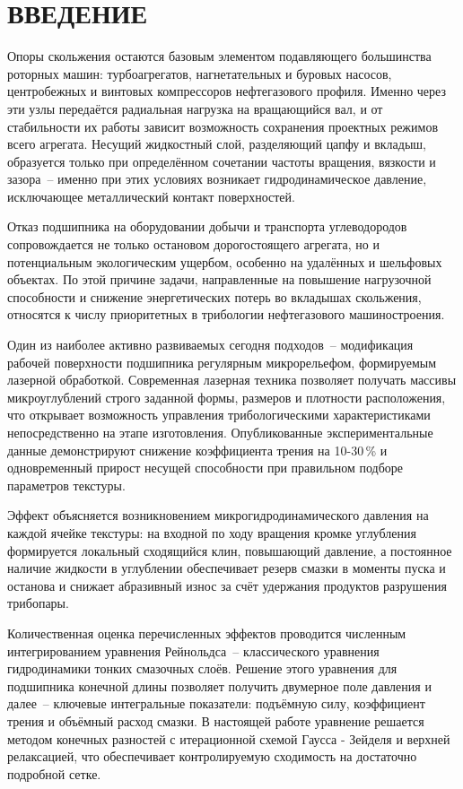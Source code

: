 \section*{ВВЕДЕНИЕ}

Опоры скольжения остаются базовым элементом подавляющего большинства роторных машин: турбоагрегатов, нагнетательных и буровых насосов, центробежных и винтовых компрессоров нефтегазового профиля. Именно через эти узлы передаётся радиальная нагрузка на вращающийся вал, и от стабильности их работы зависит возможность сохранения проектных режимов всего агрегата. Несущий жидкостный слой, разделяющий цапфу и вкладыш, образуется только при определённом сочетании частоты вращения, вязкости и зазора~-- именно при этих условиях возникает гидродинамическое давление, исключающее металлический контакт поверхностей.

Отказ подшипника на оборудовании добычи и транспорта углеводородов сопровождается не только остановом дорогостоящего агрегата, но и потенциальным экологическим ущербом, особенно на удалённых и шельфовых объектах. По этой причине задачи, направленные на повышение нагрузочной способности и снижение энергетических потерь во вкладышах скольжения, относятся к числу приоритетных в трибологии нефтегазового машиностроения.

Один из наиболее активно развиваемых сегодня подходов~-- модификация рабочей поверхности подшипника регулярным микрорельефом, формируемым лазерной обработкой. Современная лазерная техника позволяет получать массивы микроуглублений строго заданной формы, размеров и плотности расположения, что открывает возможность управления трибологическими характеристиками непосредственно на этапе изготовления. Опубликованные экспериментальные данные демонстрируют снижение коэффициента трения на 10-30\,\% и одновременный прирост несущей способности при правильном подборе параметров текстуры.

Эффект объясняется возникновением микрогидродинамического давления на каждой ячейке текстуры: на входной по ходу вращения кромке углубления формируется локальный сходящийся клин, повышающий давление, а постоянное наличие жидкости в углублении обеспечивает резерв смазки в моменты пуска и останова и снижает абразивный износ за счёт удержания продуктов разрушения трибопары.

Количественная оценка перечисленных эффектов проводится численным интегрированием уравнения Рейнольдса~-- классического уравнения гидродинамики тонких смазочных слоёв. Решение этого уравнения для подшипника конечной длины позволяет получить двумерное поле давления и далее~-- ключевые интегральные показатели: подъёмную силу, коэффициент трения и объёмный расход смазки. В настоящей работе уравнение решается методом конечных разностей с итерационной схемой Гаусса - Зейделя и верхней релаксацией, что обеспечивает контролируемую сходимость на достаточно подробной сетке.

